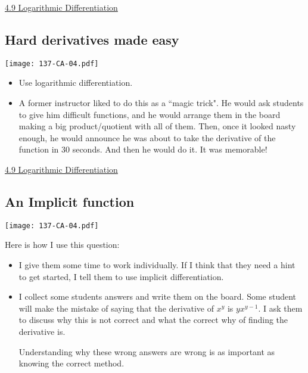 \documentclass[11pt]{article}
\newcommand{\nl}{\hfill \vspace{-1.1\baselineskip}} %
\newcommand{\vix}{\hspace{8mm} \href{https://www.youtube.com/watch?v=0iF8AUWVrb0&list=PLlwePzQY_wW-EDeUZebRoA8HGoeZxxpEU&index=9}{4.9 Logarithmic Differentiation}}
\begin{document}
\vspace{-1mm}
\begin{videos}
\vix
\end{videos}

\newpage
\subsection{Hard derivatives made easy} 

\begin{center}
{ \texttt{[image: 137-CA-04.pdf]}} 
\end{center}


\begin{comments}
\nl
\begin{itemize}
	\item Use logarithmic differentiation.
	\item A former instructor liked to do this as a ``magic trick".  He would ask students to give him difficult functions, and he would arrange them in the board making a big product/quotient with all of them.  Then, once it looked nasty enough, he would announce he was about to take the derivative of the function in 30 seconds.  And then he would do it.  It was memorable!
\end{itemize}	
\end{comments}

\begin{videos}
\vix
\end{videos}

\newpage
\subsection{An Implicit function} 

\begin{center}
{ \texttt{[image: 137-CA-04.pdf]}} 
\end{center}


\begin{comments}
\nl
	\item Here is how I use this question:
	\begin{itemize}
	\item I give them some time to work individually. If I think that they need a hint to get started, I tell them to use implicit differentiation.
	\item I collect some students answers and write them on the board. Some student will make the mistake of saying that the derivative of $x^y$ is $yx^{y-1}$. I ask them to discuss why this is not correct and what the correct why of finding the derivative is.
	
	Understanding why these wrong answers are wrong is as important as knowing the correct method.
	\end{itemize}

\end{comments}
\end{document}
